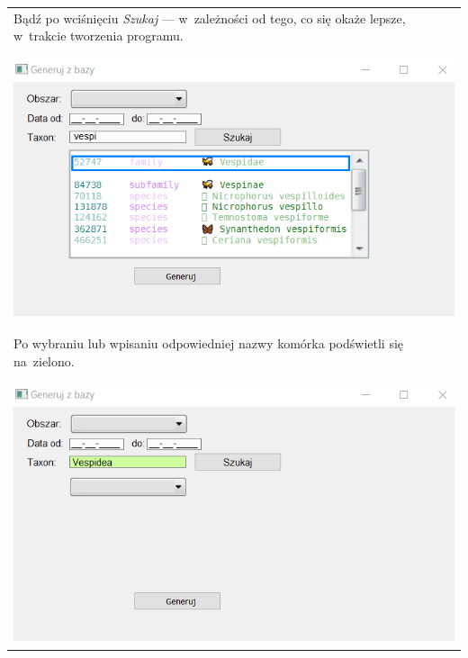 \documentclass{article}
\begin{document}
\begin{center}
\begin{tabular}{l}
Bądź po wciśnięciu \textit{Szukaj} --- w~zależności od tego, co się okaże lepsze, w~trakcie tworzenia programu.\\\\
\\\includegraphics[scale = 1]{"gzb2.png"}\\\\
\\Po wybraniu lub wpisaniu odpowiedniej nazwy komórka podświetli się na~zielono.\\\\
\\\includegraphics[scale = 1]{"gzb3.png"}
\end{tabular}
\end{center}
\end{document}

